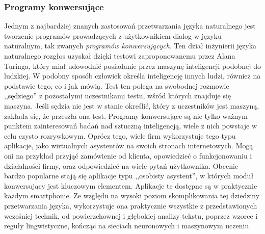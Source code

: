 \documentclass[a4paper, twoside, 12pt]{report}
\begin{document}
            \subsubsection{Programy konwersujące}
                Jednym z najbardziej znanych zastosowań przetwarzania języka naturalnego jest tworzenie programów
                prowadzących z użytkownikiem dialog w języku naturalnym, tak zwanych \emph{programów konwersujących}.
                Ten dział inżynierii języka naturalnego rozgłos uzyskał dzięki testowi zaproponowanemu przez Alana Turinga,
                który miał udowodnić posiadanie przez maszynę inteligencji podobnej do ludzkiej. W podobny sposób człowiek
                określa inteligencję innych ludzi, również na podstawie tego, co i jak mówią. Test ten polega na swobodnej
                rozmowie ,,sędziego'' z pozostałymi uczestnikami testu, wśród których znajduje się maszyna. Jeśli sędzia
                nie jest w stanie określić, który z uczestników jest maszyną, zakłada się, że przeszła ona test.
                Programy konwersujące są nie tylko ważnym punktem zainteresowań badań nad sztuczną inteligencją, wiele z
                nich powstaje w celu czysto rozrywkowym. Oprócz tego, wiele firm wykorzystuje tego typu aplikacje,
                jako wirtualnych asystentów na swoich stronach internetowych. Mogą oni na przykład przyjąć zamówienie od
                klienta, opowiedzieć o funkcjonowaniu i działalności firmy, oraz odpowiedzieć na wiele pytań użytkownika.
                Obecnie bardzo popularne stają się aplikacje typu ,,osobisty asystent'', w których moduł konwersujący jest
                kluczowym elementem. Aplikacje te dostępne są w praktycznie każdym smartphonie. Ze względu na wysoki
                poziom skomplikowania tej dziedziny przetwarzania języka, wykorzystuje ona praktycznie wszystkie z
                przedstawionych wcześniej technik, od powierzchownej i głębokiej analizy tekstu, poprzez wzorce i reguły
                lingwistyczne, kończąc na sieciach neuronowych i maszynowym uczeniu
\end{document}
